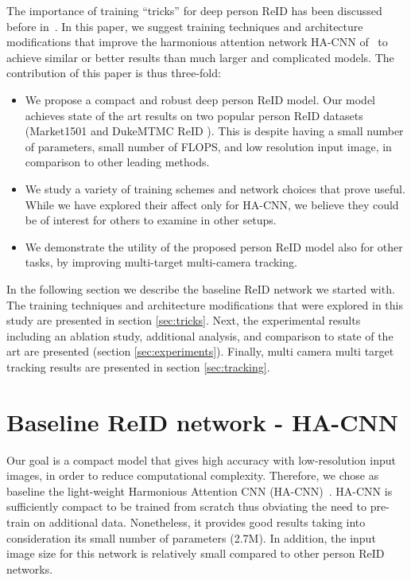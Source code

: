 \documentclass[sigconf]{acmart}
\begin{document}
The importance of training ``tricks'' for deep person ReID has been discussed before in~\cite{luo2019bag}.
In this paper, we suggest training techniques and architecture modifications that improve the harmonious attention network HA-CNN of~\cite{li2018harmonious} to achieve similar or better results than much larger and complicated models.
The contribution of this paper is thus three-fold:
\begin{itemize}
  \item  We propose a compact and robust deep person ReID model. Our model achieves state of the art results on two popular person ReID datasets (Market1501 and DukeMTMC ReID \cite{ristani2016dukemtmc}). This is despite having a small number of parameters, small number of FLOPS, and low resolution input image, in comparison to other leading methods.

  \item We study a variety of training schemes and network choices that prove useful. While we have explored their affect only for HA-CNN, we believe they could be of interest for others to examine in other setups.

  \item We demonstrate the utility of the proposed person ReID model also for other tasks, by improving multi-target multi-camera tracking.

\end{itemize}

In the following section we describe the baseline ReID network we started with. The training techniques and architecture modifications that were explored in this study are presented in section \ref{sec:tricks}. Next, the experimental results including an ablation study, additional analysis, and comparison to state of the art are presented (section \ref{sec:experiments}). Finally, multi camera multi target tracking results are presented in section \ref{sec:tracking}.

\section{Baseline ReID network - HA-CNN}
Our goal is a compact model that gives high accuracy with low-resolution input images, in order to reduce computational complexity.
Therefore, we chose as baseline the light-weight Harmonious Attention CNN (HA-CNN)~\cite{li2018harmonious}. HA-CNN is sufficiently compact to be trained from scratch thus obviating the need to pre-train on additional data. Nonetheless, it provides good results taking into consideration its small number of parameters (2.7M).
In addition, the input image size for this network is relatively small compared to other person ReID networks.
\end{document}
